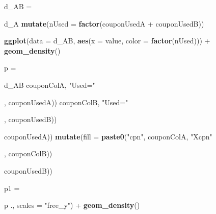 \documentclass[10pt]{report}
\newenvironment{Shaded}{}{}
\newcommand{\KeywordTok}[1]{\textcolor[rgb]{0.00,0.44,0.13}{\textbf{{#1}}}}
\newcommand{\DataTypeTok}[1]{\textcolor[rgb]{0.56,0.13,0.00}{{#1}}}
\newcommand{\FloatTok}[1]{\textcolor[rgb]{0.25,0.63,0.44}{{#1}}}
\newcommand{\StringTok}[1]{\textcolor[rgb]{0.25,0.44,0.63}{{#1}}}
\newcommand{\NormalTok}[1]{{#1}}
\begin{document}
\begin{Shaded}
\begin{Highlighting}[]
{{{{{{{{    \NormalTok{d_AB =}\StringTok{ }\NormalTok{d_A %>%}\StringTok{ }\KeywordTok{left_join}\NormalTok{(d_B, }\DataTypeTok{by =} \KeywordTok{c}\NormalTok{(}\StringTok{"orderID"}\NormalTok{, }\StringTok{"sim_meas"}\NormalTok{, }\StringTok{"value"}\NormalTok{)) %>%}\StringTok{ }
\StringTok{        }\KeywordTok{mutate}\NormalTok{(}\DataTypeTok{nUsed =} \KeywordTok{factor}\NormalTok{(couponUsedA +}\StringTok{ }\NormalTok{couponUsedB))}
    
    \KeywordTok{ggplot}\NormalTok{(}\DataTypeTok{data =} \NormalTok{d_AB, }\KeywordTok{aes}\NormalTok{(}\DataTypeTok{x =} \NormalTok{value, }\DataTypeTok{color =} \KeywordTok{factor}\NormalTok{(nUsed))) +}\StringTok{ }\KeywordTok{geom_density}\NormalTok{()}
    
    \NormalTok{p =}\StringTok{ }\NormalTok{d_AB %>%}\StringTok{ }\KeywordTok{filter}\NormalTok{(!}\KeywordTok{is.na}\NormalTok{(couponUsedA)) %>%}\StringTok{ }\KeywordTok{mutate}\NormalTok{(}\DataTypeTok{usedColA =} \KeywordTok{paste0}\NormalTok{(}\StringTok{"coupon"}\NormalTok{, }
        \NormalTok{couponColA, }\StringTok{"Used="}\NormalTok{, couponUsedA)) %>%}\StringTok{ }\KeywordTok{mutate}\NormalTok{(}\DataTypeTok{usedColB =} \KeywordTok{paste0}\NormalTok{(}\StringTok{"coupon"}\NormalTok{, }
        \NormalTok{couponColB, }\StringTok{"Used="}\NormalTok{, couponUsedB)) %>%}\StringTok{ }\KeywordTok{mutate}\NormalTok{(}\DataTypeTok{usedA =} \KeywordTok{paste0}\NormalTok{(}\StringTok{"couponAUsed="}\NormalTok{, }
        \NormalTok{couponUsedA)) %>%}\StringTok{ }\KeywordTok{mutate}\NormalTok{(}\DataTypeTok{usedB =} \KeywordTok{paste0}\NormalTok{(}\StringTok{"couponBUsed="}\NormalTok{, couponUsedB)) %>%}\StringTok{ }
\StringTok{        }\KeywordTok{mutate}\NormalTok{(}\DataTypeTok{fill =} \KeywordTok{paste0}\NormalTok{(}\StringTok{"cpn"}\NormalTok{, couponColA, }\StringTok{"Xcpn"}\NormalTok{, couponColB)) %>%}\StringTok{ }\KeywordTok{mutate}\NormalTok{(}\DataTypeTok{nUsed =} \KeywordTok{factor}\NormalTok{(couponUsedA +}\StringTok{ }
\StringTok{        }\NormalTok{couponUsedB)) %>%}\StringTok{ }\KeywordTok{mutate}\NormalTok{(}\DataTypeTok{similarity =} \NormalTok{value)}
    
    \NormalTok{p1 =}\StringTok{ }\NormalTok{p %>%}\StringTok{ }\KeywordTok{ggplot}\NormalTok{(}\KeywordTok{aes}\NormalTok{(}\DataTypeTok{fill =} \NormalTok{usedA, }\DataTypeTok{x =} \NormalTok{similarity, }\DataTypeTok{alpha =} \FloatTok{0.2}\NormalTok{)) +}\StringTok{ }\KeywordTok{facet_grid}\NormalTok{(usedB ~}\StringTok{ }
\StringTok{        }\NormalTok{., }\DataTypeTok{scales =} \StringTok{"free_y"}\NormalTok{) +}\StringTok{ }\KeywordTok{geom_density}\NormalTok{()}
    
}}}}}}}}}}}}}}}}
\end{Highlighting}
\end{Shaded}
\end{document}
